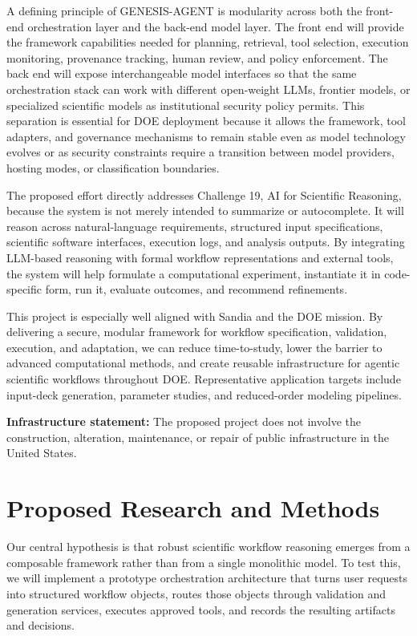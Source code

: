 \documentclass[11pt]{article} \usepackage[margin=1in]{geometry}
\begin{document}
A defining principle of GENESIS-AGENT is modularity across both the front-end
orchestration layer and the back-end model layer. The front end will provide the
framework capabilities needed for planning, retrieval, tool selection, execution
monitoring, provenance tracking, human review, and policy enforcement. The back
end will expose interchangeable model interfaces so that the same orchestration
stack can work with different open-weight LLMs, frontier models, or specialized
scientific models as institutional security policy permits. This separation is
essential for DOE deployment because it allows the framework, tool adapters, and
governance mechanisms to remain stable even as model technology evolves or as
security constraints require a transition between model providers, hosting
modes, or classification boundaries.

The proposed effort directly addresses Challenge 19, AI for Scientific
Reasoning, because the system is not merely intended to summarize or
autocomplete. It will reason across natural-language requirements, structured
input specifications, scientific software interfaces, execution logs, and
analysis outputs. By integrating LLM-based reasoning with formal workflow
representations and external tools, the system will help formulate a
computational experiment, instantiate it in code-specific form, run it, evaluate
outcomes, and recommend refinements.

This project is especially well aligned with Sandia and the DOE mission. By
delivering a secure, modular framework for workflow specification, validation,
execution, and adaptation, we can reduce time-to-study, lower the barrier to
advanced computational methods, and create reusable infrastructure for agentic
scientific workflows throughout DOE. Representative application targets include
input-deck generation, parameter studies, and reduced-order modeling pipelines.

\textbf{Infrastructure statement:} The proposed project does not involve the
construction, alteration, maintenance, or repair of public infrastructure in the
United States.

\section{Proposed Research and Methods} Our central hypothesis is that robust
scientific workflow reasoning emerges from a composable framework rather than
from a single monolithic model. To test this, we will implement a prototype
orchestration architecture that turns user requests into structured workflow
objects, routes those objects through validation and generation services,
executes approved tools, and records the resulting artifacts and decisions.
\end{document}
